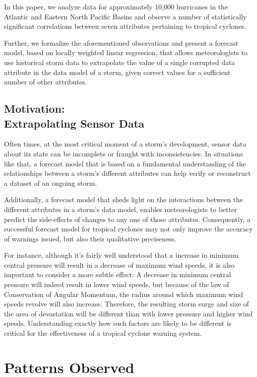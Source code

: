 \documentclass[letterpaper,twocolumn,10pt]{article}
\begin{document}
In this paper, we analyze data for approximately 10,000 hurricanes in the
Atlantic and Eastern North Pacific Basins and observe a number of statistically
significant correlations between seven attributes pertaining to tropical
cyclones.

Further, we formalize the aforementioned observations and present a forecast
model, based on locally weighted linear regression, that allows meteorologists
to use historical storm data to extrapolate the value of a single corrupted data
attribute in the data model of a storm, given correct values for a sufficient
number of other attributes.

\subsection{Motivation:\\Extrapolating Sensor Data}
Often times, at the most critical moment of a storm's development, sensor data
about its state can be incomplete or fraught with inconsistencies. In situations
like that, a forecast model that is based on a fundamental understanding of the
relationships between a storm's different attributes can help verify or 
reconstruct a dataset of an ongoing storm.

Additionally, a forecast model that sheds light on the interactions between
the different attributes in a storm's data model, enables meteorologists to
better predict the side-effects of changes to any one of those attributes.
Consequently, a successful forecast model for tropical cyclones may not only
improve the accuracy of warnings issued, but also their qualitative preciseness.

For instance, although it's fairly well understood that a increase in minimum
central pressure will result in a decrease of maximum wind speeds, it is also
important to consider a more subtle effect: A decrease in minimum central
pressure will indeed result in lower wind speeds, but because of the law of
Conservation of Angular Momentum, the radius around which maximum wind speeds
revolve will also increase. Therefore, the resulting storm surge and size of the
area of devastation will be different than with lower pressure and higher wind
speeds. Understanding exactly how such factors are likely to be different is
critical for the effectiveness of a tropical cyclone warning system.


\section{Patterns Observed}
\end{document}

